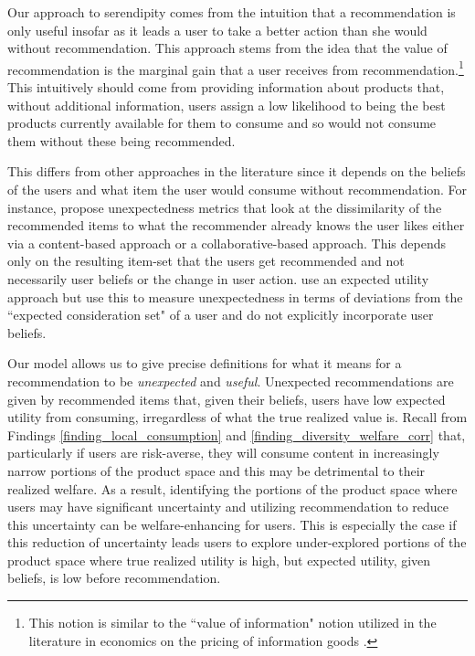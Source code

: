 \documentclass[sigconf, anonymous, review]{acmart}
\begin{document}
Our approach to serendipity comes from the intuition that a recommendation is only useful insofar as it leads a user to take a better action than she would without recommendation. This approach stems from the idea that the value of recommendation is the marginal gain that a user receives from recommendation.\footnote{This notion is similar to the ``value of information" notion utilized in the literature in economics on the pricing of information goods \cite{bergemann2018design}.} This intuitively should come from providing information about products that, without additional information, users assign a low likelihood to being the best products currently available for them to consume and so would not consume them without these being recommended.
\par

This differs from other approaches in the literature since it depends on the beliefs of the users and what item the user would consume without recommendation. For instance, \cite{vargas2011rank, kaminskas2014measuring} propose unexpectedness metrics that look at the dissimilarity of the recommended items to what the recommender already knows the user likes either via a content-based approach or a collaborative-based approach. This depends only on the resulting item-set that the users get recommended and not necessarily user beliefs or the change in user action. \cite{adamopoulos2014unexpectedness} use an expected utility approach but use this to measure unexpectedness in terms of deviations from the ``expected consideration set" of a user and do not explicitly incorporate user beliefs.
\par

Our model allows us to give precise definitions for what it means for a recommendation to be \textit{unexpected} and \textit{useful}. Unexpected recommendations are given by recommended items that, given their beliefs, users have low expected utility from consuming, irregardless of what the true realized value is. Recall from Findings \ref{finding_local_consumption} and \ref{finding_diversity_welfare_corr} that, particularly if users are risk-averse, they will consume content in increasingly narrow portions of the product space and this may be detrimental to their realized welfare. As a result, identifying the portions of the product space where users may have significant uncertainty and utilizing recommendation to reduce this uncertainty can be welfare-enhancing for users. This is especially the case if this reduction of uncertainty leads users to explore under-explored portions of the product space where true realized utility is high, but expected utility, given beliefs, is low before recommendation.
\par
\end{document}
